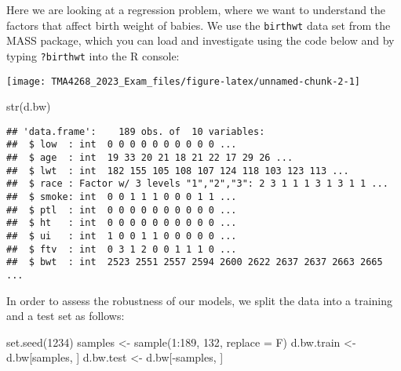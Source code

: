 \documentclass[
]{article}
\newenvironment{Shaded}{\begin{snugshade}}{\end{snugshade}}
\newcommand{\AttributeTok}[1]{\textcolor[rgb]{0.77,0.63,0.00}{#1}}
\newcommand{\CommentTok}[1]{\textcolor[rgb]{0.56,0.35,0.01}{\textit{#1}}}
\newcommand{\DecValTok}[1]{\textcolor[rgb]{0.00,0.00,0.81}{#1}}
\newcommand{\FunctionTok}[1]{\textcolor[rgb]{0.00,0.00,0.00}{#1}}
\newcommand{\NormalTok}[1]{#1}
\newcommand{\OtherTok}[1]{\textcolor[rgb]{0.56,0.35,0.01}{#1}}
\newcommand{\SpecialCharTok}[1]{\textcolor[rgb]{0.00,0.00,0.00}{#1}}
\begin{document}
Here we are looking at a regression problem, where we want to understand
the factors that affect birth weight of babies. We use the
\texttt{birthwt} data set from the MASS package, which you can load and
investigate using the code below and by typing \texttt{?birthwt} into
the R console:

\begin{Shaded}
\end{Shaded}

\texttt{[image: TMA4268\_2023\_Exam\_files/figure-latex/unnamed-chunk-2-1]}

\begin{Shaded}
\begin{Highlighting}[]
\FunctionTok{str}\NormalTok{(d.bw)}
\end{Highlighting}
\end{Shaded}

\begin{verbatim}
## 'data.frame':    189 obs. of  10 variables:
##  $ low  : int  0 0 0 0 0 0 0 0 0 0 ...
##  $ age  : int  19 33 20 21 18 21 22 17 29 26 ...
##  $ lwt  : int  182 155 105 108 107 124 118 103 123 113 ...
##  $ race : Factor w/ 3 levels "1","2","3": 2 3 1 1 1 3 1 3 1 1 ...
##  $ smoke: int  0 0 1 1 1 0 0 0 1 1 ...
##  $ ptl  : int  0 0 0 0 0 0 0 0 0 0 ...
##  $ ht   : int  0 0 0 0 0 0 0 0 0 0 ...
##  $ ui   : int  1 0 0 1 1 0 0 0 0 0 ...
##  $ ftv  : int  0 3 1 2 0 0 1 1 1 0 ...
##  $ bwt  : int  2523 2551 2557 2594 2600 2622 2637 2637 2663 2665 ...
\end{verbatim}

In order to assess the robustness of our models, we split the data into
a training and a test set as follows:

\begin{Shaded}
\begin{Highlighting}[]
\FunctionTok{set.seed}\NormalTok{(}\DecValTok{1234}\NormalTok{)}
\NormalTok{samples }\OtherTok{\textless{}{-}} \FunctionTok{sample}\NormalTok{(}\DecValTok{1}\SpecialCharTok{:}\DecValTok{189}\NormalTok{, }\DecValTok{132}\NormalTok{, }\AttributeTok{replace =}\NormalTok{ F)}
\NormalTok{d.bw.train }\OtherTok{\textless{}{-}}\NormalTok{ d.bw[samples, ]}
\NormalTok{d.bw.test }\OtherTok{\textless{}{-}}\NormalTok{ d.bw[}\SpecialCharTok{{-}}\NormalTok{samples, ]}
\end{Highlighting}
\end{Shaded}
\end{document}
